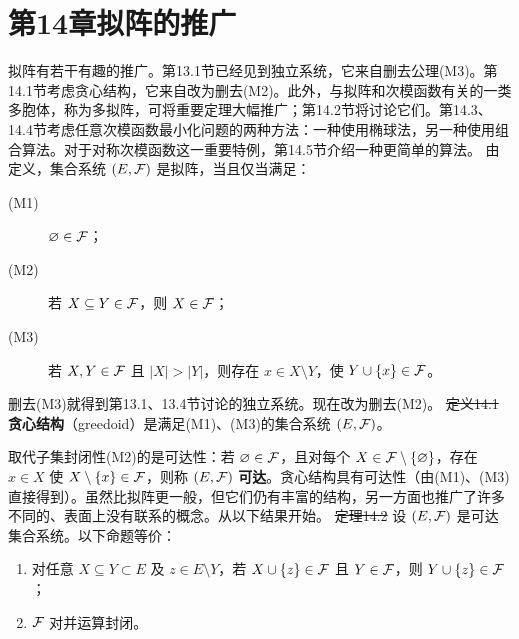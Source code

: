 \section*{第14章\quad 拟阵的推广}
拟阵有若干有趣的推广。第13.1节已经见到独立系统，它来自删去公理(M3)。第14.1节考虑贪心结构，它来自改为删去(M2)。此外，与拟阵和次模函数有关的一类多胞体，称为多拟阵，可将重要定理大幅推广；第14.2节将讨论它们。第14.3、14.4节考虑任意次模函数最小化问题的两种方法：一种使用椭球法，另一种使用组合算法。对于对称次模函数这一重要特例，第14.5节介绍一种更简单的算法。
由定义，集合系统 $(E,\mathcal F)$ 是拟阵，当且仅当满足：
\begin{description}
\item[(M1)] $\varnothing\in\mathcal F$；
\item[(M2)] 若 $X\subseteq Y\in\mathcal F$，则 $X\in\mathcal F$；
\item[(M3)] 若 $X,Y\in\mathcal F$ 且 $|X|>|Y|$，则存在 $x\in X\setminus Y$，使 $Y\cup\{x\}\in\mathcal F$。
\end{description}
删去(M3)就得到第13.1、13.4节讨论的独立系统。现在改为删去(M2)。
\st{定义14.1} \textbf{贪心结构}（greedoid）是满足(M1)、(M3)的集合系统 $(E,\mathcal F)$。

取代子集封闭性(M2)的是可达性：若 $\varnothing\in\mathcal F$，且对每个 $X\in\mathcal F\setminus\{\varnothing\}$，存在 $x\in X$ 使 $X\setminus\{x\}\in\mathcal F$，则称 $(E,\mathcal F)$ \textbf{可达}。贪心结构具有可达性（由(M1)、(M3)直接得到）。虽然比拟阵更一般，但它们仍有丰富的结构，另一方面也推广了许多不同的、表面上没有联系的概念。从以下结果开始。
\st{定理14.2} 设 $(E,\mathcal F)$ 是可达集合系统。以下命题等价：
\begin{enumerate}[label=(\alph*)]
\item 对任意 $X\subseteq Y\subset E$ 及 $z\in E\setminus Y$，若 $X\cup\{z\}\in\mathcal F$ 且 $Y\in\mathcal F$，则 $Y\cup\{z\}\in\mathcal F$；
\item $\mathcal F$ 对并运算封闭。
\end{enumerate}

